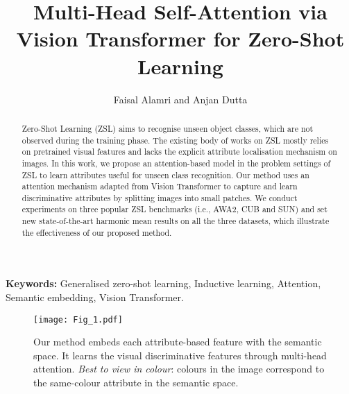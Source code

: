 \documentclass[a4paper,11pt]{article}
\newcommand{\anjan}[1]{\textcolor{red}{Anjan: #1}}
\begin{document}
\title{Multi-Head Self-Attention via\\Vision Transformer for Zero-Shot Learning}

\author{Faisal Alamri and Anjan Dutta}
\date{}
\maketitle
\thispagestyle{empty}

\begin{abstract}
Zero-Shot Learning (ZSL) aims to recognise unseen object classes, which are not observed during the training phase. The existing body of works on ZSL mostly relies on pretrained visual features and lacks the explicit attribute localisation mechanism on images. In this work, we propose an attention-based model in the problem settings of ZSL to learn attributes useful for unseen class recognition. Our method uses an attention mechanism adapted from Vision Transformer to capture and learn discriminative attributes by splitting images into small patches. We conduct experiments on three popular ZSL benchmarks (i.e., AWA2, CUB and SUN) and set new state-of-the-art harmonic mean results {on all the three datasets}, which illustrate the effectiveness of our proposed method.
\end{abstract}





\textbf{Keywords:} Generalised zero-shot learning, Inductive learning, Attention, Semantic embedding, Vision Transformer.%

\begin{wrapfigure}{r}{0.45\textwidth} 
\vspace{-30pt}
\begin{center}
\texttt{[image: Fig\_1.pdf]}
\end{center}
\vspace{-25pt}
\caption{Our method embeds each attribute-based feature with the semantic space. It learns the visual discriminative features through multi-head attention. \textit{Best to view in colour}: colours in the image correspond to the same-colour attribute in the semantic space.} %
\label{Into_fig}
\end{wrapfigure}
\end{document}
